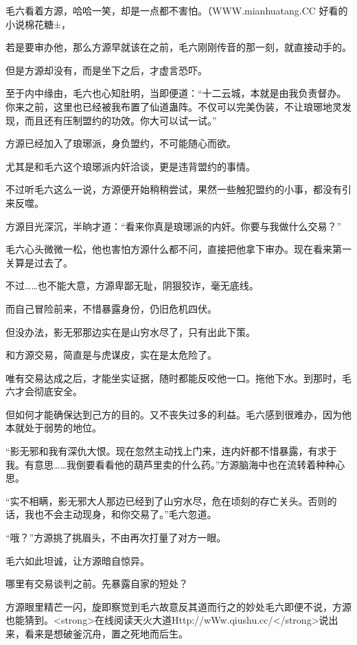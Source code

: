 
\begin{this_body}

毛六看着方源，哈哈一笑，却是一点都不害怕。（WWW.mianhuatang.CC 好看的小说棉花糖±，

若是要审办他，那么方源早就该在之前，毛六刚刚传音的那一刻，就直接动手的。

但是方源却没有，而是坐下之后，才虚言恐吓。

至于内中缘由，毛六也心知肚明，当即便道：“十二云城，本就是由我负责督办。你来之前，这里也已经被我布置了仙道蛊阵。不仅可以完美伪装，不让琅琊地灵发现，而且还有压制盟约的功效。你大可以试一试。”

方源已经加入了琅琊派，身负盟约，不可能随心而欲。

尤其是和毛六这个琅琊派内奸洽谈，更是违背盟约的事情。

不过听毛六这么一说，方源便开始稍稍尝试，果然一些触犯盟约的小事，都没有引来反噬。

方源目光深沉，半晌才道：“看来你真是琅琊派的内奸。你要与我做什么交易？”

毛六心头微微一松，他也害怕方源什么都不问，直接把他拿下审办。现在看来第一关算是过去了。

不过……也不能大意，方源卑鄙无耻，阴狠狡诈，毫无底线。

而自己冒险前来，不惜暴露身份，仍旧危机四伏。

但没办法，影无邪那边实在是山穷水尽了，只有出此下策。

和方源交易，简直是与虎谋皮，实在是太危险了。

唯有交易达成之后，才能坐实证据，随时都能反咬他一口。拖他下水。到那时，毛六才会彻底安全。

但如何才能确保达到己方的目的。又不丧失过多的利益。毛六感到很难办，因为他本就处于弱势的地位。

“影无邪和我有深仇大恨。现在忽然主动找上门来，连内奸都不惜暴露，有求于我。有意思……我倒要看看他的葫芦里卖的什么药。”方源脑海中也在流转着种种心思。

“实不相瞒，影无邪大人那边已经到了山穷水尽，危在顷刻的存亡关头。否则的话，我也不会主动现身，和你交易了。”毛六忽道。

“哦？”方源挑了挑眉头，不由再次打量了对方一眼。

毛六如此坦诚，让方源暗自惊异。

哪里有交易谈判之前。先暴露自家的短处？

方源眼里精芒一闪，旋即察觉到毛六故意反其道而行之的妙处毛六即便不说，方源也能猜到。<strong>在线阅读天火大道Http://wWw.qiushu.cc/</strong>说出来，看来是想破釜沉舟，置之死地而后生。


\end{this_body}
